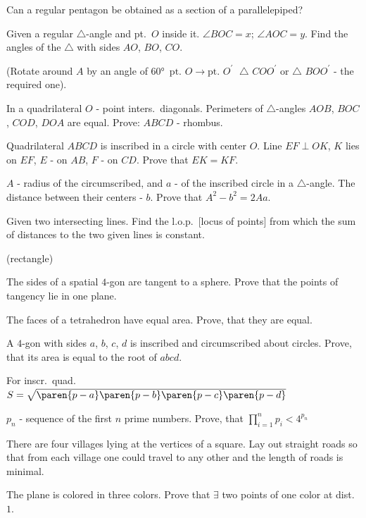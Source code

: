 \documentclass{article}
\newcommand{\strikethrough}[1]{}  %
\begin{document}
\problem  %
Can a regular pentagon be obtained as a section of a parallelepiped?


\problem  %
Given a regular \strikethrough{polygon} $\triangle$-angle and pt.\ $O$ inside it.
$\angle BOC = x$; $\angle AOC = y$.
Find the angles of the $\triangle$ with sides $AO$, $BO$, $CO$.

(Rotate around $A$ by an angle of $\ang{60} \,$
$\text{pt.\ } O \to \text{pt.\ } O^{\prime}$
$\; \triangle$ $COO^{\prime}$ or $\triangle$ $BOO^{\prime}$ - the required one).


\problem  %
In a quadrilateral $O$ - point inters.\ diagonals.
Perimeters of $\triangle$-angles $AOB$, $BOC$, $COD$, $DOA$ are equal.
Prove: $ABCD$ - rhombus.


\problem  %
Quadrilateral $ABCD$ is inscribed in a circle with center $O$.
Line $EF \perp OK$, $K$ lies on $EF$, $E$ - on $AB$, $F$ - on $CD$.
Prove that $EK = KF$.


\problem  %
$A$ - radius of the circumscribed, and $a$ - of the inscribed circle in a $\triangle$-angle.
The distance between their centers - $b$.
Prove that $A^2 - b^2 = 2 A a$.


\problem  %
Given two intersecting lines.
Find the l.o.p.\ [locus of points] from which the sum of distances to the two given lines is constant.

(rectangle)


\problem  %
The sides of a spatial $4$-gon are tangent to a sphere.
Prove that the points of tangency lie in one plane.


\problem  %
The faces of a tetrahedron have equal area.
Prove, that they are equal.


\problem  %
A $4$-gon with sides $a$, $b$, $c$, $d$ is inscribed and circumscribed about circles.
Prove, that its area is equal to the root of $a b c d$.

For inscr.\ quad.\ $S = \sqrt{\paren{p - a} \paren{p - b} \paren{p - c} \paren{p - d}}$


\problem  %
$p_n$ - sequence of the first $n$ prime numbers.
Prove, that $\displaystyle{\prod\limits_{i = 1}^n {p_i} < 4^{p_n}}$


\problem  %
There are four villages lying at the vertices of a square.
Lay out straight roads so that from each village one could travel to any other and the length of roads is minimal.


\problem  %
The plane is colored in three colors.
Prove that $\exists$ two points of one color at dist.\ $1$.
\end{document}
